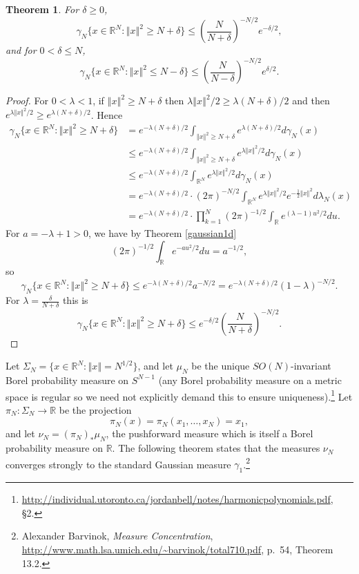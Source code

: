 \documentclass{article}
\newcommand{\norm}[1]{\left\Vert #1 \right\Vert}
\newtheorem{theorem}{Theorem}
\theoremstyle{definition}
\begin{document}
\begin{theorem}
For $\delta \geq 0$,
\[
\gamma_N\{x \in \mathbb{R}^N: \norm{x}^2 \geq N+\delta \} \leq \left( \frac{N}{N+\delta} \right)^{-N/2} e^{-\delta/2},
\]
and for $0<\delta \leq N$,
\[
\gamma_N\{x \in \mathbb{R}^N: \norm{x}^2 \leq N-\delta\} \leq \left(\frac{N}{N-\delta} \right)^{-N/2} e^{\delta/2}.
\]
\end{theorem}
\begin{proof}
For $0<\lambda<1$, if $\norm{x}^2 \geq N+\delta$ then $\lambda \norm{x}^2/2 \geq \lambda(N+\delta)/2$
and then $e^{\lambda \norm{x}^2/2} \geq e^{\lambda(N+\delta)/2}$.
Hence
\begin{align*}
\gamma_N\{x \in \mathbb{R}^N: \norm{x}^2 \geq N+\delta\}&=e^{-\lambda(N+\delta)/2} \int_{\norm{x}^2 \geq N+\delta} e^{\lambda(N+\delta)/2} d\gamma_N(x)\\
&\leq e^{-\lambda(N+\delta)/2} \int_{\norm{x}^2 \geq N+\delta} e^{\lambda \norm{x}^2/2} d\gamma_N(x)\\
&\leq e^{-\lambda(N+\delta)/2} \int_{\mathbb{R}^N} e^{\lambda \norm{x}^2/2} d\gamma_N(x)\\
&=  e^{-\lambda(N+\delta)/2} 
\cdot  (2\pi)^{-N/2}
\int_{\mathbb{R}^N} e^{\lambda \norm{x}^2/2}    e^{-\frac{1}{2}\norm{x}^2} d\lambda_N(x)\\
&=  e^{-\lambda(N+\delta)/2}  \cdot \prod_{k=1}^N (2\pi)^{-1/2} \int_{\mathbb{R}} e^{(\lambda-1) u^2/2} du.
\end{align*}
For $a=-\lambda+1>0$, we have by Theorem \ref{gaussian1d}
\[
(2\pi)^{-1/2} \int_{\mathbb{R}}  e^{-au^2/2} du = a^{-1/2},
\]
so
\[
\gamma_N\{x \in \mathbb{R}^N: \norm{x}^2 \geq N+\delta\} \leq
e^{-\lambda(N+\delta)/2}  a^{-N/2} = e^{-\lambda(N+\delta)/2}   (1-\lambda)^{-N/2}.
\]
For $\lambda=\frac{\delta}{N+\delta}$ this is
\[
\gamma_N\{x \in \mathbb{R}^N: \norm{x}^2 \geq N+\delta\} \leq e^{-\delta/2} \left( \frac{N}{N+\delta} \right)^{-N/2}.
\]
\end{proof}


Let $\Sigma_N=\{x \in \mathbb{R}^N: \norm{x} = N^{1/2}\}$, and let $\mu_N$ be the unique
$SO(N)$-invariant  Borel probability measure on $S^{N-1}$ (any Borel probability measure on a metric space is regular so we need not explicitly demand this to ensure uniqueness).\footnote{\url{http://individual.utoronto.ca/jordanbell/notes/harmonicpolynomials.pdf},
\S 2.}
Let $\pi_N:\Sigma_N \to \mathbb{R}$ be the projection 
\[
\pi_N(x) = \pi_N(x_1,\ldots,x_N) = x_1,
\]
and let $\nu_N=(\pi_N)_* \mu_N$, the pushforward measure which is itself a Borel probability measure on $\mathbb{R}$. 
The following theorem states that the measures $\nu_N$ converges strongly to the standard Gaussian measure $\gamma_1$.\footnote{Alexander
Barvinok, {\em Measure Concentration}, \url{http://www.math.lsa.umich.edu/~barvinok/total710.pdf},
p.~54, Theorem 13.2.}
\end{document}
